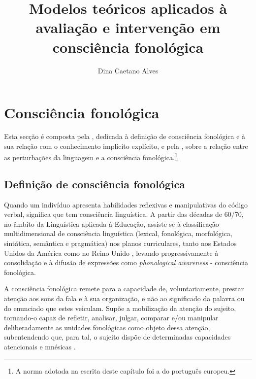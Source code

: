 \documentclass[output=paper,colorlinks,citecolor=brown,booklanguage=portuguese]{langscibook}
\title{Modelos teóricos aplicados à avaliação e intervenção em consciência fonológica}
\author{Dina Caetano Alves\affiliation{Instituto Politécnico de Setúbal; Universidade de Lisboa, Centro de Linguística; Centro Interdisciplinar de Investigação Aplicada em Saúde do Instituto Politécnico de Setúbal}}
\begin{document}
\maketitle

\section{Consciência fonológica}\label{sec:cap10sec1}
Esta secção é composta pela , dedicada à definição de consciência fonológica e à sua relação com o conhecimento implícito explícito, e pela , sobre a relação entre as perturbações da linguagem e a consciência fonológica.\footnote{A norma adotada na escrita deste capítulo foi a do português europeu.}

\subsection{Definição de consciência fonológica}\label{sec:cap10sec1.1}
Quando um indivíduo apresenta habilidades reflexivas e manipulativas do código verbal, significa que tem consciência linguística. A partir das décadas de 60/70, no âmbito da Linguística aplicada à Educação, assiste-se à classificação multidimensional de consciência linguística (lexical, fonológica, morfológica, sintática, semântica e pragmática) nos planos curriculares, tanto nos Estados Unidos da América \citep{Honda2010} como no Reino Unido \citep{Hudson1992}, levando progressivamente à consolidação e à difusão de expressões como \emph{phonological awareness} - consciência fonológica.

A consciência fonológica remete para a capacidade de, voluntariamente, prestar atenção aos sons da fala e à sua organização, e não ao significado da palavra ou do enunciado que estes veiculam. Supõe a mobilização da atenção do sujeito, tornando-o capaz de refletir, analisar, julgar, comparar e/ou manipular deliberadamente as unidades fonológicas como objeto dessa atenção, subentendendo que, para tal, o sujeito dispõe de determinadas capacidades atencionais e mnésicas \citep{Chard1999, Gillon2004}.
\end{document}

